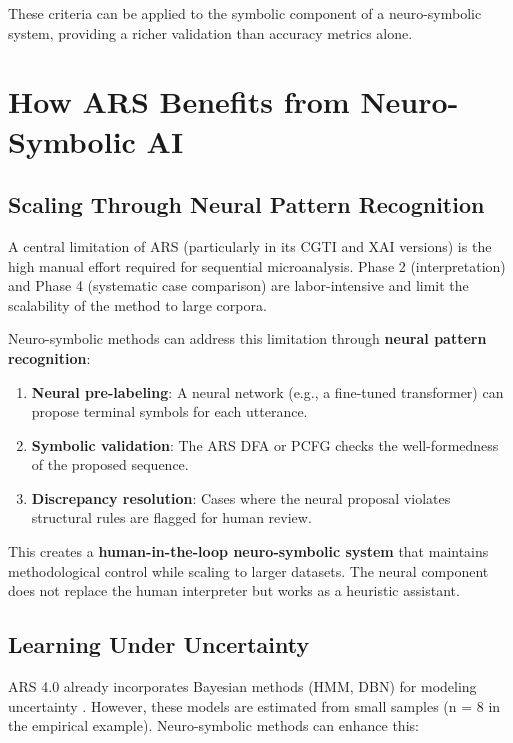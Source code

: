 \documentclass[12pt,a4paper]{article}
\begin{document}
These criteria can be applied to the symbolic component of a neuro-symbolic 
system, providing a richer validation than accuracy metrics alone.

\section{How ARS Benefits from Neuro-Symbolic AI}

\subsection{Scaling Through Neural Pattern Recognition}

A central limitation of ARS (particularly in its CGTI and XAI versions) is the 
high manual effort required for sequential microanalysis. Phase 2 (interpretation) 
and Phase 4 (systematic case comparison) are labor-intensive and limit the 
scalability of the method to large corpora.

Neuro-symbolic methods can address this limitation through \textbf{neural pattern 
recognition}:

\begin{enumerate}
    \item \textbf{Neural pre-labeling}: A neural network (e.g., a fine-tuned 
    transformer) can propose terminal symbols for each utterance.
    \item \textbf{Symbolic validation}: The ARS DFA or PCFG checks the 
    well-formedness of the proposed sequence.
    \item \textbf{Discrepancy resolution}: Cases where the neural proposal 
    violates structural rules are flagged for human review.
\end{enumerate}

This creates a \textbf{human-in-the-loop neuro-symbolic system} that maintains 
methodological control while scaling to larger datasets. The neural component 
does not replace the human interpreter but works as a heuristic assistant.

\subsection{Learning Under Uncertainty}

ARS 4.0 already incorporates Bayesian methods (HMM, DBN) for modeling uncertainty 
\citep{koop2024bayes}. However, these models are estimated from small samples 
(n = 8 in the empirical example). Neuro-symbolic methods can enhance this:
\end{document}
